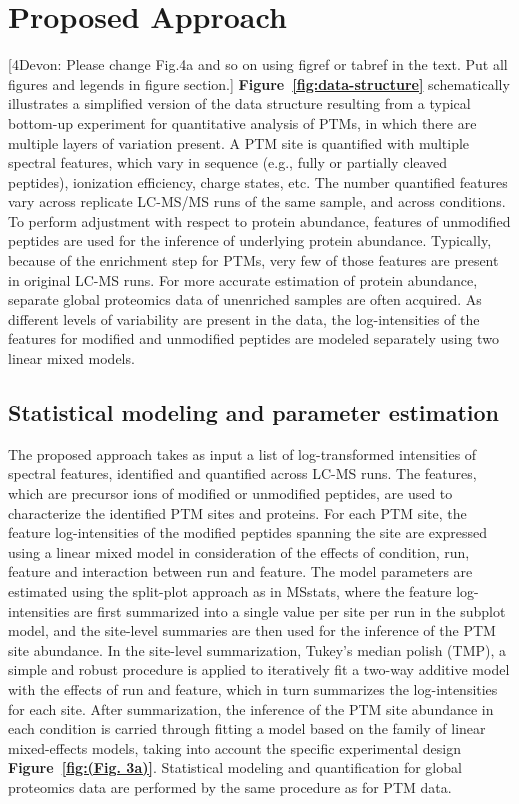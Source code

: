 \documentclass[mcp]{article}
\numberwithin{figure}{section} %
\numberwithin{table}{section}
\def\devon#1{{\color{green}[4Devon: #1]}}
\def\figref#1{{\bf Figure~\ref{fig:#1}}}
\begin{document}
\section{Proposed Approach}

\devon{Please change Fig.4a and so on using figref or tabref in the text. Put all figures and legends in figure section.}
\figref{data-structure} schematically illustrates a simplified version of the data structure resulting from a typical bottom-up experiment for quantitative analysis of PTMs, in which there are multiple layers of variation present. A PTM site is quantified with multiple spectral features, which vary in sequence (e.g., fully or partially cleaved peptides), ionization efficiency, charge states, etc. The number quantified features vary across replicate LC-MS/MS runs of the same sample, and across conditions. To perform adjustment with respect to protein abundance, features of unmodified peptides are used for the inference of underlying protein abundance. Typically, because of the enrichment step for PTMs, very few of those features are present in original LC-MS runs. For more accurate estimation of protein abundance, separate global proteomics data of unenriched samples are often acquired. As different levels of variability are present in the data, the log-intensities of the features for modified and unmodified peptides are modeled separately using two linear mixed models. 

\subsection*{Statistical modeling and parameter estimation}

The proposed approach takes as input a list of log-transformed intensities of spectral features, identified and quantified across LC-MS runs. The features, which are precursor ions of modified or unmodified peptides, are used to characterize the identified PTM sites and proteins. For each PTM site, the feature log-intensities of the modified peptides spanning the site are expressed using a linear mixed model in consideration of the effects of condition, run, feature and interaction between run and feature. The model parameters are estimated using the split-plot approach as in MSstats, where the feature log-intensities are first summarized into a single value per site per run in the subplot model, and the site-level summaries are then used for the inference of the PTM site abundance.\cite{Choi:2014} In the site-level summarization, Tukey's median polish (TMP), a simple and robust procedure is applied to iteratively fit a two-way additive model with the effects of run and feature, which in turn summarizes the log-intensities for each site.\cite{Tukey:1977} After summarization, the inference of the PTM site abundance in each condition is carried through fitting a model based on the family of linear mixed-effects models, taking into account the specific experimental design \figref{(Fig. 3a)}.\cite{Bolker2009} \cite{Faraway:2006} Statistical modeling and quantification for global proteomics data are performed by the same procedure as for PTM data.  
\end{document}

